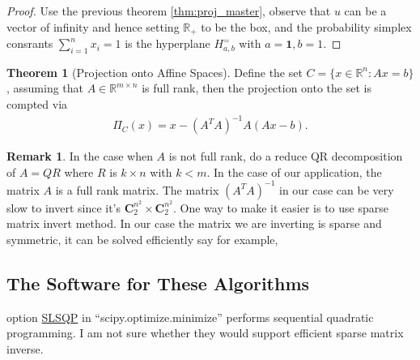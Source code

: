 \documentclass[11pt]{article}
\theoremstyle{definition}
\newtheorem{theorem}{Theorem}       %
\newtheorem{remark}{Remark}[subsection]
{
    \newtheorem{assumption}{Assumption}
}
\numberwithin{equation}{subsection}
\begin{document}
        \begin{proof}
            Use the previous theorem \ref*{thm:proj_master}, observe that $u$ can be a vector of infinity and hence setting $\mathbb R_+$ to be the box, and the probability simplex consrants $\sum_{i = 1}^{n}x_i = 1$ is the hyperplane $H_{a, b}^=$ with $a = \mathbf 1, b = 1$. 
        \end{proof}
        \begin{theorem}[Projection onto Affine Spaces]
            Define the set $C = \{x\in \mathbb R^n : Ax = b\}$, assuming that $A\in \mathbb R^{m\times n}$ is full rank, then the projection onto the set is compted via 
            \begin{align*}
                \Pi_{C}(x) = x - (A^TA)^{-1}A(Ax - b). 
            \end{align*}
        \end{theorem}
        \begin{remark}
            In the case when $A$ is not full rank, do a reduce QR decomposition of $A = Q R$ where $R$ is $k\times n$ with $k < m$. 
            In the case of our application, the matrix $A$ is a full rank matrix. 
            The matrix $(A^TA)^{-1}$ in our case can be very slow to invert since it's $\mathbf C^{n^2}_2 \times \mathbf C^{n^2}_2$. 
            One way to make it easier is to use sparse matrix invert method. 
            In our case the matrix we are inverting is sparse and symmetric, it can be solved efficiently say for example, 
        \end{remark}
    \subsection{The Software for These Algorithms}
        option \href{https://docs.scipy.org/doc/scipy/reference/optimize.minimize-slsqp.html}{SLSQP} in ``scipy.optimize.minimize'' performs sequential quadratic programming. 
        I am not sure whether they would support efficient sparse matrix inverse. 

        


\appendix



\end{document}
